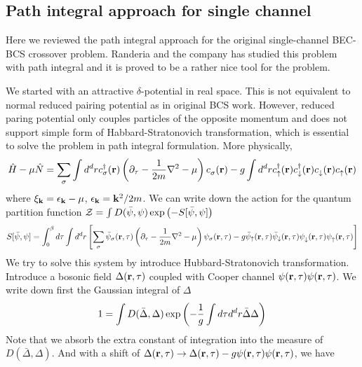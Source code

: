 \subsection{Path integral approach for single channel\label{sec:pathInt}}
Here we reviewed the path integral approach for the original single-channel BEC-BCS crossover problem. Randeria and the company \cite{RanderiaBEC, Randeria1997, Randeria2008} has studied this problem with path integral and it is proved to be a rather nice tool for the problem.  

We started with an attractive $\delta$-potential in real space.  This is not equivalent to normal reduced pairing potential as in original BCS work.  However, reduced paring potential only couples  particles of the opposite momentum and does not support simple form of Habbard-Stratonovich transformation, which is essential to solve the problem in path integral formulation.   More physically,
\begin{equation}
\hat{H}-\mu\hat{N}=\sum_{\sigma}\int{d^{d}r}c^{\dagger}_{\sigma}(\mathbf{r})\left(\partial_{\tau}-\frac{1}{2m}\nabla^{2}-\mu\right)c^{}_{\sigma}(\mathbf{r})-g\int{d^{d}r}c^{\dagger}_{\uparrow}(\mathbf{r})c^{\dagger}_{\downarrow}(\mathbf{r})c^{}_{\downarrow}(\mathbf{r})c^{}_{\uparrow}(\mathbf{r})
\end{equation}
where $\xi_{\mathbf{k}}=\epsilon_{\mathbf{k}}-\mu$, $\epsilon_{\mathbf{k}}=\mathbf{k}^{2}/2m$.  We can write down the action for the quantum partition function $\mathcal{Z}=\int{D(\bar\psi,\psi)\exp\ensuremath{\left(-S[\bar\psi,\psi]\right)}}$
\begin{equation}
S[\bar\psi,\psi]=\int^{\beta}_{0}d\tau\int{d^{d}r}\left[\sum_{\sigma}\bar\psi_{\sigma}(\mathbf{r},\tau)\left(\partial_{\tau}-\frac{1}{2m}\nabla^{2}-\mu\right)\psi_{\sigma}(\mathbf{r},\tau)-g\bar\psi_{\uparrow}(\mathbf{r},\tau)\bar\psi_{\downarrow}(\mathbf{r},\tau)\psi^{}_{\downarrow}(\mathbf{r},\tau)\psi^{}_{\uparrow}(\mathbf{r},\tau)\right]
\end{equation}
We try to solve this system by introduce Hubbard-Stratonovich transformation.   Introduce a bosonic field $\Delta(\mathbf{r},\tau)$ coupled with Cooper channel $\psi(\mathbf{r},\tau)\psi(\mathbf{r},\tau)$. %
We write down first the Gaussian integral of $\Delta$
\begin{equation}
1=\int{D(\bar\Delta,\Delta)}\exp\left(-\frac{1}{g}\int{d\tau{d}^{d}r}\bar\Delta\Delta\right)
\end{equation}
Note that we absorb the extra constant of integration into the measure of $D(\bar\Delta,\Delta)$.
And with a shift of $\Delta(\mathbf{r},\tau)\rightarrow\Delta(\mathbf{r},\tau)-g\psi(\mathbf{r},\tau)\psi(\mathbf{r},\tau)$, we have 
